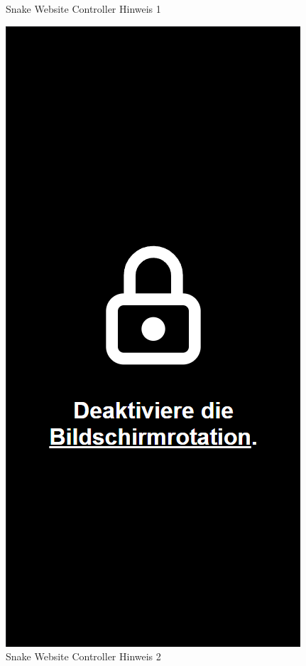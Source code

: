 \documentclass[a4paper,12pt]{scrartcl}
\begin{document}
\begin{figure}[!h]
\begin{minipage}[t]{.4\linewidth}
      \caption{Snake Website Controller Hinweis 1}
      \label{fig:controller-hint-1}
   \end{minipage}
   \hspace{.1\linewidth}%
   \begin{minipage}[t]{.4\linewidth}
      \includegraphics[width=\linewidth]{Abbildungen/Snake_Controller_hint_2.png}
      \caption{Snake Website Controller Hinweis 2}
      \label{fig:controller-hint-2}
   \end{minipage}
\end{figure}
\end{document}
